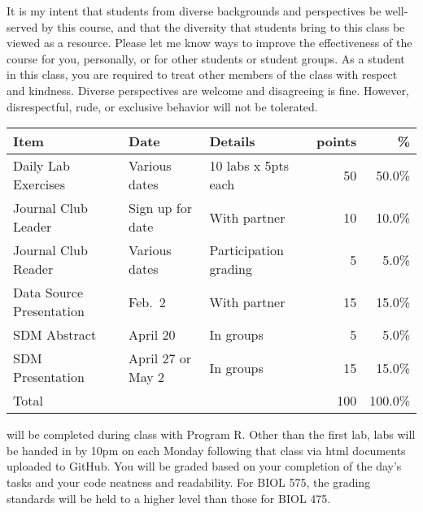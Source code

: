 \documentclass{tufte-handout}
\begin{document}
\begin{fullwidth}
 It is my intent that students from diverse backgrounds and perspectives be well-served by this course, and that the diversity that students bring to this class be viewed as a resource. Please let me know ways to improve the effectiveness of the course for you, personally, or for other students or student groups. As a student in this class, you are required to treat other members of the class with respect and kindness. Diverse perspectives are welcome and disagreeing is fine. However, disrespectful, rude, or exclusive behavior will not be tolerated.


\end{fullwidth}


\begin{fullwidth}



\begin{table}
\begin{tabular}{l l l r r}
Item & Date & Details & points & \% \\
\hline
Daily Lab Exercises & Various dates & 10 labs x 5pts each & 50 & 50.0\% \\
Journal Club Leader & Sign up for date & With partner & 10 & 10.0\% \\	
Journal Club Reader & Various dates & Participation grading & 5 & 5.0\% \\
Data Source Presentation &  Feb.~2 & With partner & 15 & 15.0\% \\
SDM Abstract & April 20 & In groups & 5 & 5.0\% \\
SDM Presentation & April 27 or May 2 & In groups & 15 & 15.0\% \\
\hline
Total & & & 100 & 100.0\% 
\end{tabular}
\end{table}

\end{fullwidth}

 will be completed during class with Program R. Other than the first lab, labs will be handed in by 10pm on each Monday following that class via html documents uploaded to GitHub. You will be graded based on your completion of the day's tasks and your code neatness and readability. For BIOL 575, the grading standards will be held to a higher level than those for BIOL 475. 
\end{document}

